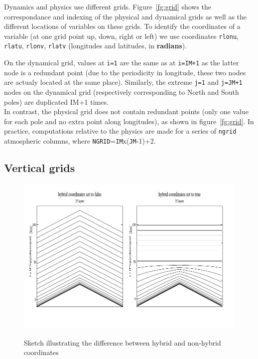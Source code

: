 Dynamics and physics use different grids.
Figure~\ref{fg:grid} shows the correspondance and indexing
of the physical and dynamical grids
as well as the different locations of variables on these grids.
To identify the coordinates of a variable (at one grid point up,
down, right or left)
we use coordinates {\tt rlonu}, {\tt rlatu},
 {\tt rlonv}, {\tt rlatv} (longitudes and
latitudes, in {\bf radians}).

On the dynamical grid, values at {\tt i=1} are the same as at {\tt i=IM+1}
as the latter node is a redundant point (due to the periodicity in longitude,
these two nodes are actualy located at the same place).
Similarly, the extreme {\tt j=1} and {\tt j=JM+1} nodes on the
dynamical grid (respectively corresponding to North and South poles)
are duplicated IM+1 times.\\
In contrast, the physical grid does not contain redundant points
(only one value for each pole and no extra point along longitudes),
as shown in figure~\ref{fg:grid}.
In practice, computations relative to the physics are made 
for a series of {\tt ngrid} atmospheric
columns, where {\tt NGRID}={\tt IM}x({\tt JM}-1)+2. 

\subsection{Vertical grids}

\begin{figure}[htbp]
                                                                                
{\includegraphics[scale=0.85,clip=true]{Fig/coord.pdf}}
\caption[hybrides]
 {Sketch illustrating the difference between hybrid and non-hybrid coordinates}
 \label{fg:hybrid}
\end{figure}


